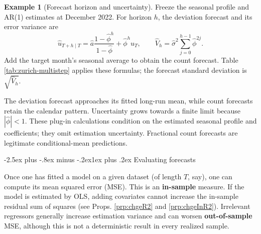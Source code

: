 \documentclass[
  11pt,
]{book}
\makeatletter
\renewcommand\subsection{\@startsection{subsection}{2}{\z@}
  {-2.5ex plus -.8ex minus -.2ex}{1ex plus .2ex}
  {\normalfont\large\bfseries\color{TextbookInk}}}
\theoremstyle{definition}
\theoremstyle{definition}
\newtheorem{example}{Example}[chapter]
\theoremstyle{definition}
\theoremstyle{definition}
\theoremstyle{remark}
\makeatother
\begin{document}
\begin{example}[Forecast horizon and uncertainty]
\protect\hypertarget{exm:zurich-multistep}{}\label{exm:zurich-multistep}Freeze the seasonal profile and AR(1) estimates at December 2022. For horizon \(h\), the deviation forecast and its error variance are
\[
\widehat u_{T+h\mid T}=\widehat a\frac{1-\widehat\phi^h}{1-\widehat\phi}
+\widehat\phi^h u_T,
\qquad
\widehat V_h=\widehat\sigma^2\sum_{j=0}^{h-1}\widehat\phi^{2j}.
\]
Add the target month's seasonal average to obtain the count forecast. Table \ref{tab:zurich-multistep} applies these formulas; the forecast standard deviation is \(\sqrt{\widehat V_h}\).

\begin{table}[H]
\centering
\caption{\label{tab:zurich-multistep}Forecasts made in December 2022. Counts and standard deviations are in accidents per month.}
\centering
{}
\end{table}

The deviation forecast approaches its fitted long-run mean, while count forecasts retain the calendar pattern. Uncertainty grows towards a finite limit because \(|\widehat\phi|<1\). These plug-in calculations condition on the estimated seasonal profile and coefficients; they omit estimation uncertainty. Fractional count forecasts are legitimate conditional-mean predictions.
\end{example}

\subsection{Evaluating forecasts}\label{forecast-evaluation}

Once one has fitted a model on a given dataset (of length \(T\), say), one can compute its mean squared error (MSE). This is an \textbf{in-sample} measure. If the model is estimated by OLS, adding covariates cannot increase the in-sample residual sum of squares (see Props. \ref{prp:chgeR2} and \ref{prp:chgeInR2}). Irrelevant regressors generally increase estimation variance and can worsen \textbf{out-of-sample} MSE, although this is not a deterministic result in every realized sample.
\end{document}
